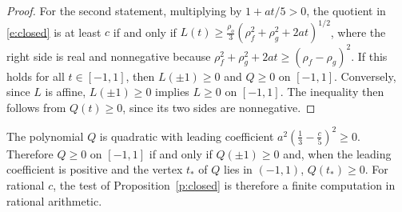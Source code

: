\begin{proof}
For the second statement, multiplying by $1 + at/5 > 0$, the quotient in \eqref{e:closed} is at least $c$ if and only if $L(t) \ge \frac{\rho_o}{3} (\rho_f^2 + \rho_g^2 + 2at)^{1/2}$, where the right side is real and nonnegative because $\rho_f^2 + \rho_g^2 + 2at \ge (\rho_f - \rho_g)^2$. If this holds for all $t \in [-1, 1]$, then $L(\pm 1) \ge 0$ and $Q \ge 0$ on $[-1, 1]$. Conversely, since $L$ is affine, $L(\pm 1) \ge 0$ implies $L \ge 0$ on $[-1, 1]$. The inequality then follows from $Q(t) \ge 0$, since its two sides are nonnegative.
\end{proof}

The polynomial $Q$ is quadratic with leading coefficient $a^2 (\frac13 - \frac c5)^2 \ge 0$. Therefore $Q \ge 0$ on $[-1, 1]$ if and only if $Q(\pm 1) \ge 0$ and, when the leading coefficient is positive and the vertex $t_*$ of $Q$ lies in $(-1, 1)$, $Q(t_*) \ge 0$. For rational $c$, the test of Proposition~\ref{p:closed} is therefore a finite computation in rational arithmetic.

